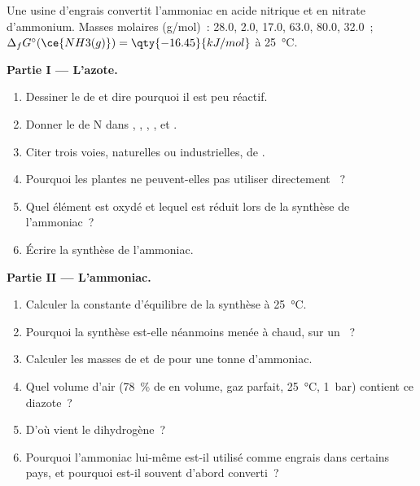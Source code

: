 \begin{problem}
\label{pb:b1:p-block-13-15:1}
Une usine d'engrais convertit l'ammoniac en acide nitrique et en nitrate
d'ammonium. Masses molaires (\unit{g/mol})~:  28.0,  2.0, 
17.0,  63.0,  80.0,  32.0~;
$\Delta_f G^\circ(\ce{NH3(g)}) = \qty{-16.45}{kJ/mol}$ à
\qty{25}{\celsius}.

\medskip
\noindent\textbf{Partie I --- L'azote.}
\begin{enumerate}
  \item Dessiner le  de  et dire pourquoi il est peu
        réactif.
  \item Donner le  de N dans , , ,
        ,  et .
  \item Citer trois voies, naturelles ou industrielles, de .
  \item Pourquoi les plantes ne peuvent-elles pas utiliser directement
        ~?
  \item Quel élément est oxydé et lequel est réduit lors de la synthèse
        de l'ammoniac~?
  \item Écrire la synthèse de l'ammoniac.
\end{enumerate}

\medskip
\noindent\textbf{Partie II --- L'ammoniac.}
\begin{enumerate}[resume]
  \item Calculer la constante d'équilibre de la synthèse à
        \qty{25}{\celsius}.
  \item Pourquoi la synthèse est-elle néanmoins menée à chaud, sur un
        ~?
  \item Calculer les masses de  et de  pour une tonne
        d'ammoniac.
  \item Quel volume d'air (\qty{78}{\percent} de  en volume, gaz
        parfait, \qty{25}{\celsius}, \qty{1}{bar}) contient ce diazote~?
  \item D'où vient le dihydrogène~?
  \item Pourquoi l'ammoniac lui-même est-il utilisé comme engrais dans
        certains pays, et pourquoi est-il souvent d'abord converti~?
\end{enumerate}


\end{problem}
